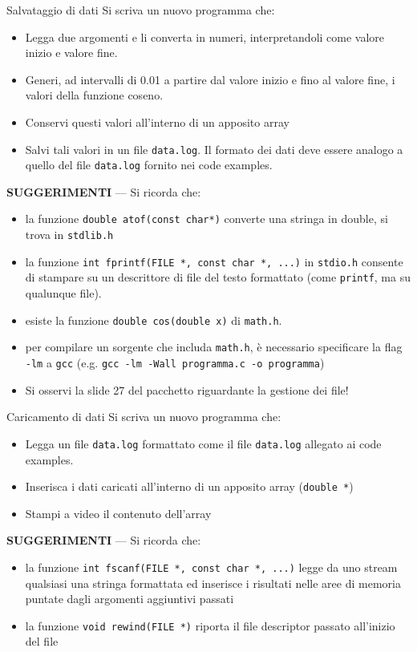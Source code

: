 \documentclass{beamer}
\begin{document}
\begin{frame}[fragile]{Salvataggio di dati}
Si scriva un nuovo programma che:
\begin{itemize}
 \item Legga due argomenti e li converta in numeri, interpretandoli come valore inizio e valore fine.
 \item Generi, ad intervalli di 0.01 a partire dal valore inizio e fino al valore fine, i valori della funzione coseno.
 \item Conservi questi valori all'interno di un apposito array
 \item Salvi tali valori in un file \texttt{data.log}. Il formato dei dati deve essere analogo a quello del file \texttt{data.log} fornito nei code examples.
\end{itemize}
\scriptsize
\textbf{SUGGERIMENTI} --- Si ricorda che:
\begin{itemize}
 \item la funzione \texttt{double atof(const char*)} converte una stringa in double, si trova in \texttt{stdlib.h}
 \item la funzione \texttt{int fprintf(FILE *, const char *, ...)} in \texttt{stdio.h} consente di stampare su un descrittore di file del testo formattato (come \texttt{printf}, ma su qualunque file).
 \item esiste la funzione \texttt{double cos(double x)} di \texttt{math.h}.
 \item per compilare un sorgente che includa \texttt{math.h}, è necessario specificare la flag \texttt{-lm} a \texttt{gcc} (e.g. \texttt{gcc -lm -Wall programma.c -o programma})
 \item Si osservi la slide 27 del pacchetto riguardante la gestione dei file!
\end{itemize}
\end{frame}

\begin{frame}[fragile]{Caricamento di dati}
Si scriva un nuovo programma che:
\begin{itemize}
 \item Legga un file \texttt{data.log} formattato come il file \texttt{data.log} allegato ai code examples.
 \item Inserisca i dati caricati all'interno di un apposito array (\texttt{double *})
 \item Stampi a video il contenuto dell'array
\end{itemize}
\scriptsize
\textbf{SUGGERIMENTI} --- Si ricorda che:
\begin{itemize}
 \item la funzione \texttt{int fscanf(FILE *, const char *, ...)} legge da uno stream qualsiasi una stringa formattata ed inserisce i risultati nelle aree di memoria puntate dagli argomenti aggiuntivi passati
 \item la funzione \texttt{void rewind(FILE *)} riporta il file descriptor passato all'inizio del file
\end{itemize}
\end{frame}
\end{document}
